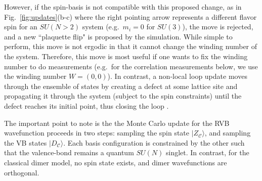 \documentclass[11pt]{iopart}
\begin{document}
%
However, if the spin-basis is not compatible with this proposed change, as in Fig.~\ref{fig:updates}(b-c) where the right pointing arrow represents a different flavor spin for an $SU(N>2)$ system (e.g.\ $m_i=0$ for $SU(3)$), the move is rejected, and a new ``plaquette flip" is proposed by the simulation.
%
While simple to perform, this move is not ergodic in that it cannot change the winding number of the system.
%
Therefore, this move is most useful if one wants to fix the winding number to do measurements (e.g.\ for the correlation measurements below, we use the winding number $W=(0,0)$).
%
In contrast, a non-local loop update moves through the ensemble of states by creating a defect at some lattice site and propagating it through the system (subject to the spin constraints) until the defect reaches its initial point, thus closing the loop \cite{sandvik2010loop}.
%

The important point to note is the the Monte Carlo update for the RVB wavefunction proceeds in two steps: sampling the spin state $|Z_{\mathcal C} \rangle$, and sampling the VB states $|D_{\mathcal C} \rangle$.  Each basis configuration is constrained by the other such that the valence-bond remains a quantum $SU(N)$ singlet.  In contrast, for the classical dimer model, no spin state exists, and dimer wavefunctions are orthogonal.
\end{document}
